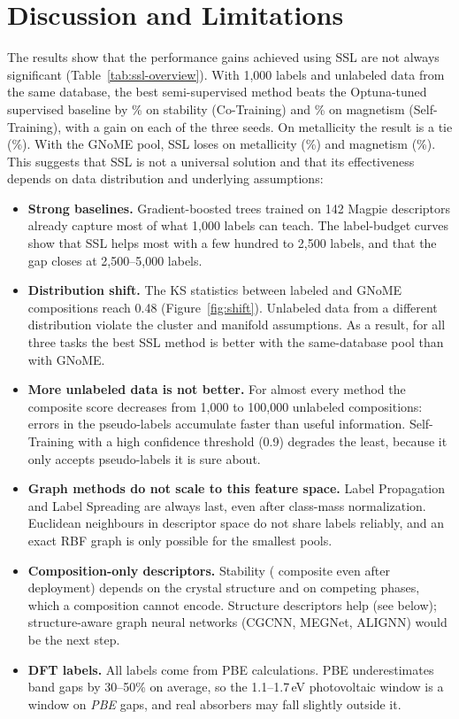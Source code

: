 \clearpage
\section{Discussion and Limitations}\label{sec:discussion}

The results show that the performance gains achieved using SSL are not always significant
(Table~\ref{tab:ssl-overview}). With 1,000 labels and unlabeled data from the same
database, the best semi-supervised method beats the Optuna-tuned supervised baseline by
\StabInImpr\% on stability (Co-Training) and \MagInImpr\% on magnetism (Self-Training), with
a gain on each of the three seeds. On metallicity the result is a tie (\MetalInImpr\%). With
the GNoME pool, SSL loses on metallicity (\MetalGnImpr\%) and magnetism (\MagGnImpr\%). This
suggests that SSL is not a universal solution and that its effectiveness depends on data
distribution and underlying assumptions:
\begin{itemize}
  \item \textbf{Strong baselines.} Gradient-boosted trees trained on 142 Magpie descriptors
  already capture most of what 1,000 labels can teach. The label-budget curves show that SSL
  helps most with a few hundred to 2,500 labels, and that the gap closes at 2,500--5,000
  labels.
  \item \textbf{Distribution shift.} The KS statistics between labeled and GNoME compositions
  reach 0.48 (Figure~\ref{fig:shift}). Unlabeled data from a different distribution violate the
  cluster and manifold assumptions. As a result, for all three tasks the best SSL method is
  better with the same-database pool than with GNoME.
  \item \textbf{More unlabeled data is not better.} For almost every method the composite
  score decreases from 1,000 to 100,000 unlabeled compositions: errors in the pseudo-labels
  accumulate faster than useful information. Self-Training with a high confidence threshold
  (0.9) degrades the least, because it only accepts pseudo-labels it is sure about.
  \item \textbf{Graph methods do not scale to this feature space.} Label Propagation and
  Label Spreading are always last, even after class-mass normalization. Euclidean neighbours in
  descriptor space do not share labels reliably, and an exact RBF graph is only possible for
  the smallest pools.
  \item \textbf{Composition-only descriptors.} Stability (\StabSelComp{} composite even after
  deployment) depends on the crystal structure and on competing phases, which a composition
  cannot encode. Structure descriptors help (see below); structure-aware graph neural networks
  (CGCNN, MEGNet, ALIGNN) would be the next step.
  \item \textbf{DFT labels.} All labels come from PBE calculations. PBE underestimates band
  gaps by 30--50\% on average, so the 1.1--1.7\,eV photovoltaic window is a window on
  \emph{PBE} gaps, and real absorbers may fall slightly outside it.
\end{itemize}

